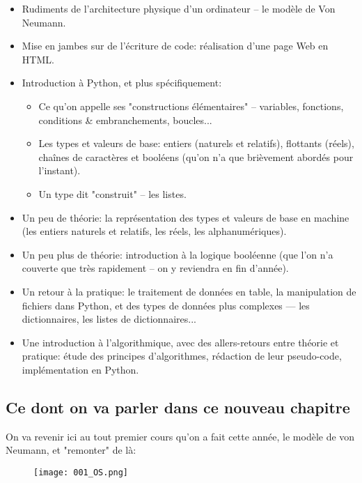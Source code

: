 \documentclass[12pt]{article}
\begin{document}
	\begin{itemize}
		\item Rudiments de l'architecture physique d'un ordinateur -- le modèle de Von Neumann.
		\item Mise en jambes sur de l'écriture de code: réalisation d'une page Web en HTML.
		\item Introduction à Python, et plus spécifiquement:
		\begin{itemize}
			\item Ce qu'on appelle ses "constructions élémentaires" -- variables, fonctions, conditions \& embranchements, boucles...
			\item Les types et valeurs de base: entiers (naturels et relatifs), flottants (réels), chaînes de caractères et booléens (qu'on n'a que brièvement abordés pour l'instant).
			\item Un type dit "construit" -- les listes.
		\end{itemize}
		\item Un peu de théorie: la représentation des types et valeurs de base en machine (les entiers naturels et relatifs, les réels, les alphanumériques).
		\item Un peu plus de théorie: introduction à la logique booléenne (que l'on n'a couverte que très rapidement -- on y reviendra en fin d'année).
		\item Un retour à la pratique: le traitement de données en table, la manipulation de fichiers dans Python, et des types de données plus complexes --- les dictionnaires, les listes de dictionnaires...
		\item Une introduction à l'algorithmique, avec des allers-retours entre théorie et pratique: étude des principes d'algorithmes, rédaction de leur pseudo-code, implémentation en Python.
	\end{itemize}
	
	\subsection{Ce dont on va parler dans ce nouveau chapitre}
	
	On va revenir ici au tout premier cours qu'on a fait cette année, le modèle de von Neumann, et "remonter" de là:
	\begin{figure}[H]
		\centering
		\texttt{[image: 001\_OS.png]}
	\end{figure}
	
\end{document}
